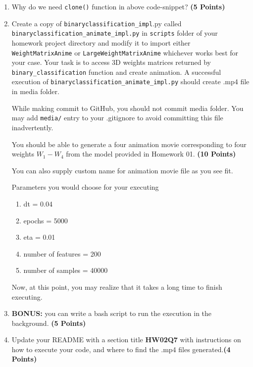 \documentclass[12pt, xcolor=dvipsnames,svgnames,x11names]{article}
\begin{document}
\begin{enumerate}
\item Why do we need \texttt{clone()} function in above code-snippet? \hfill \textbf{(5 Points)}

\item Create a copy of \texttt{binaryclassification\_impl}.py called \texttt{binaryclassification_animate_impl.py} in \texttt{scripts} folder of your homework project directory and modify it to import either \texttt{WeightMatrixAnime} or \texttt{LargeWeightMatrixAnime} whichever works best for your case. Your task is to access 3D weights matrices returned by  \texttt{binary_classification} function and create animation. A successful execution of  \texttt{binaryclassification_animate_impl.py} should create .mp4 file in media folder.

While making commit to GitHub, you should not commit media folder. You may add \texttt{media/} entry to your .gitignore to avoid committing this file inadvertently.

You should be able to generate a four animation movie corresponding to four weights $W_1 - W_4$ from the model provided in Homework 01. \hfill \textbf{(10 Points)}

You can also supply custom name for animation movie file as you see fit.

Parameters you would choose for your executing

\begin{enumerate}
\item dt = 0.04
\item epochs = 5000
\item eta = 0.01
\item number of features = 200
\item number of samples = 40000
\end{enumerate}

Now, at this point, you  may realize that it takes a long time to finish executing.


\item \textbf{BONUS:} you can write a bash script to run the execution in the background. \hfill \textbf{(5 Points)}

\item Update your README with a section title \textbf{HW02Q7} with instructions on how to execute your code, and where to find the .mp4 files generated.\hfill \textbf{(4 Points)}

\end{enumerate}
\end{document}
